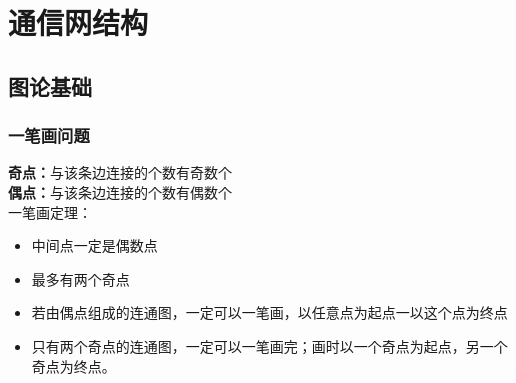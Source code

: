 \chapter{通信网结构}
\section{图论基础}
\subsection{一笔画问题}
\textbf{奇点：}与该条边连接的个数有奇数个\\
\textbf{偶点：}与该条边连接的个数有偶数个\\
一笔画定理：
\begin{itemize}
	\item 中间点一定是偶数点
	\item 最多有两个奇点
	\item 若由偶点组成的连通图，一定可以一笔画，以任意点为起点一以这个点为终点
	\item 只有两个奇点的连通图，一定可以一笔画完；画时以一个奇点为起点，另一个奇点为终点。
\end{itemize}
